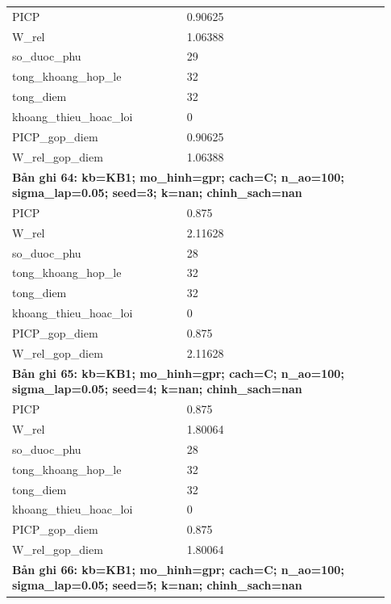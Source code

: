 \begin{longtable}{p{0.43\linewidth}p{0.50\linewidth}}
PICP & 0.90625 \\
W\_\allowbreak rel & 1.06388 \\
so\_\allowbreak duoc\_\allowbreak phu & 29 \\
tong\_\allowbreak khoang\_\allowbreak hop\_\allowbreak le & 32 \\
tong\_\allowbreak diem & 32 \\
khoang\_\allowbreak thieu\_\allowbreak hoac\_\allowbreak loi & 0 \\
PICP\_\allowbreak gop\_\allowbreak diem & 0.90625 \\
W\_\allowbreak rel\_\allowbreak gop\_\allowbreak diem & 1.06388 \\
\midrule
\multicolumn{2}{p{0.95\linewidth}}{\textbf{Bản ghi 64: kb=KB1; mo\_hinh=gpr; cach=C; n\_ao=100; sigma\_lap=0.05; seed=3; k=nan; chinh\_sach=nan}} \\
PICP & 0.875 \\
W\_\allowbreak rel & 2.11628 \\
so\_\allowbreak duoc\_\allowbreak phu & 28 \\
tong\_\allowbreak khoang\_\allowbreak hop\_\allowbreak le & 32 \\
tong\_\allowbreak diem & 32 \\
khoang\_\allowbreak thieu\_\allowbreak hoac\_\allowbreak loi & 0 \\
PICP\_\allowbreak gop\_\allowbreak diem & 0.875 \\
W\_\allowbreak rel\_\allowbreak gop\_\allowbreak diem & 2.11628 \\
\midrule
\multicolumn{2}{p{0.95\linewidth}}{\textbf{Bản ghi 65: kb=KB1; mo\_hinh=gpr; cach=C; n\_ao=100; sigma\_lap=0.05; seed=4; k=nan; chinh\_sach=nan}} \\
PICP & 0.875 \\
W\_\allowbreak rel & 1.80064 \\
so\_\allowbreak duoc\_\allowbreak phu & 28 \\
tong\_\allowbreak khoang\_\allowbreak hop\_\allowbreak le & 32 \\
tong\_\allowbreak diem & 32 \\
khoang\_\allowbreak thieu\_\allowbreak hoac\_\allowbreak loi & 0 \\
PICP\_\allowbreak gop\_\allowbreak diem & 0.875 \\
W\_\allowbreak rel\_\allowbreak gop\_\allowbreak diem & 1.80064 \\
\midrule
\multicolumn{2}{p{0.95\linewidth}}{\textbf{Bản ghi 66: kb=KB1; mo\_hinh=gpr; cach=C; n\_ao=100; sigma\_lap=0.05; seed=5; k=nan; chinh\_sach=nan}} \\

\end{longtable}
